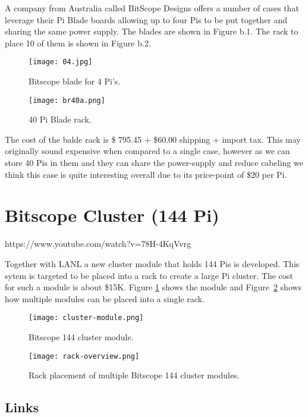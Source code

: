 A company from Australia called BitScope Designs offers a number of
cases that leverage their Pi Blade boards allowing up to four Pis to be
put together and sharing the same power supply. The blades are shown in
Figure b.1. The rack to place 10 of them is shown in Figure b.2.

\begin{figure}
\centering
\texttt{[image: 04.jpg]}
\caption{Bitscope blade for 4 Pi's.}
\end{figure}


\begin{figure}
\centering
\texttt{[image: br40a.png]}
\caption{40 Pi Blade rack.}
\end{figure}


The cost of the balde rack is \$ 795.45 + \$60.00 shipping + import tax.
This may originally sound expensive when compared to a single case,
however as we can store 40 Pis in them and they can share the
power-supply and reduce cabeling we think this case is quite interesting
overall due to its price-point of \$20 per Pi.



\section{Bitscope Cluster (144 Pi)}\label{bitscope-cluster-144-pi}

https://www.youtube.com/watch?v=78H-4KqVvrg

Together with LANL a new cluster module that holds 144 Pis is developed.
This sytem is targeted to be placed into a rack to create a large Pi
cluster. The cost for such a module is about \$15K. Figure
\ref{F:pi-mod-1} shows the
module and Figure~\ref{F:pi-mod-2} shows how multiple modules can be placed into a
single rack.

\begin{figure}
\centering
\texttt{[image: cluster-module.png]}
\caption{Bitscope 144 cluster module.}\label{F:pi-mod-1}
\end{figure}

\begin{figure}
\centering
\texttt{[image: rack-overview.png]}
\caption{Rack placement of multiple Bitscope 144 cluster modules.}\label{F:pi-mod-2}
\end{figure}




\subsection{Links}\label{links}

